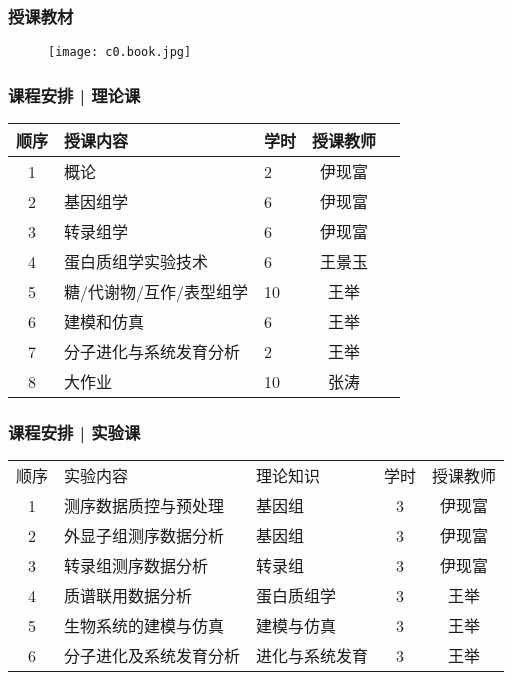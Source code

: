 \begin{frame}
\end{frame}

\begin{frame}
  \frametitle{授课教材}
  \begin{figure}
    \centering
    \texttt{[image: c0.book.jpg]}
  \end{figure}
\end{frame}

\begin{frame}
  \frametitle{课程安排 | 理论课}
  \begin{table}
    \centering
    \begin{tabular}{cllcc}
      \hline
      \rowcolor{blue!50}顺序 & 授课内容 & 学时 & 授课教师\\
      \hline
      1 & 概论 & 2 & 伊现富\\
      2 & 基因组学 & 6 & 伊现富\\
      3 & 转录组学 & 6 & 伊现富\\
      4 & 蛋白质组学实验技术 & 6 & 王景玉\\
      5 & 糖/代谢物/互作/表型组学 & 10 & 王举\\
      6 & 建模和仿真 & 6 & 王举\\
      7 & 分子进化与系统发育分析 & 2 & 王举\\
      8 & 大作业 & 10 & 张涛\\
      \hline
    \end{tabular}
  \end{table}
\end{frame}

\begin{frame}
  \frametitle{课程安排 | 实验课}
  \begin{table}
    \centering
    \begin{tabular}{cllcc}
      \hline
      \rowcolor{blue!50}顺序 & 实验内容 & 理论知识 & 学时 & 授课教师\\
      1 & 测序数据质控与预处理 & 基因组 & 3 & 伊现富\\
      2 & 外显子组测序数据分析 & 基因组 & 3 & 伊现富\\
      3 & 转录组测序数据分析 & 转录组 & 3 & 伊现富\\
      4 & 质谱联用数据分析& 蛋白质组学 & 3 & 王举\\
      5 & 生物系统的建模与仿真& 建模与仿真 & 3 & 王举\\
      6 & 分子进化及系统发育分析& 进化与系统发育 & 3 & 王举\\
      \hline
    \end{tabular}
  \end{table}
\end{frame}

